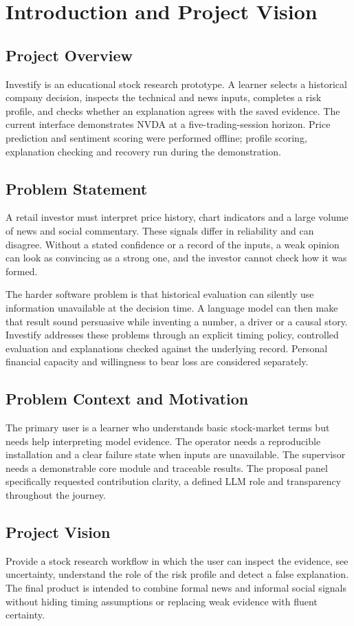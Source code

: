 \chapter{Introduction and Project Vision}
\label{chap:introduction}
\section{Project Overview}
Investify is an educational stock research prototype. A learner selects a historical company decision, inspects the technical and news inputs, completes a risk profile, and checks whether an explanation agrees with the saved evidence. The current interface demonstrates NVDA at a five-trading-session horizon. Price prediction and sentiment scoring were performed offline; profile scoring, explanation checking and recovery run during the demonstration.
\section{Problem Statement}
A retail investor must interpret price history, chart indicators and a large volume of news and social commentary. These signals differ in reliability and can disagree. Without a stated confidence or a record of the inputs, a weak opinion can look as convincing as a strong one, and the investor cannot check how it was formed.

The harder software problem is that historical evaluation can silently use information unavailable at the decision time. A language model can then make that result sound persuasive while inventing a number, a driver or a causal story. Investify addresses these problems through an explicit timing policy, controlled evaluation and explanations checked against the underlying record. Personal financial capacity and willingness to bear loss are considered separately.
\section{Problem Context and Motivation}
The primary user is a learner who understands basic stock-market terms but needs help interpreting model evidence. The operator needs a reproducible installation and a clear failure state when inputs are unavailable. The supervisor needs a demonstrable core module and traceable results. The proposal panel specifically requested contribution clarity, a defined LLM role and transparency throughout the journey.
\section{Project Vision}
Provide a stock research workflow in which the user can inspect the evidence, see uncertainty, understand the role of the risk profile and detect a false explanation. The final product is intended to combine formal news and informal social signals without hiding timing assumptions or replacing weak evidence with fluent certainty.
